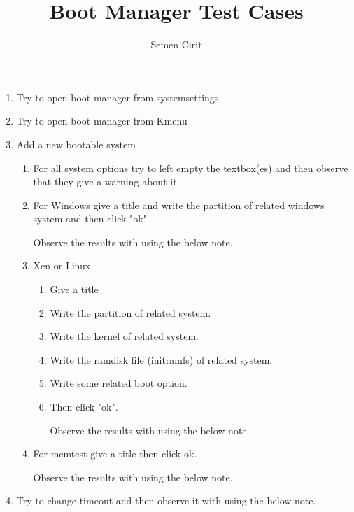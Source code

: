 \documentclass[a4paper,10pt]{article}
\title{Boot Manager Test Cases}
\author{Semen Cirit}
\begin{document}
\maketitle

\begin{enumerate}
    \item Try to open boot-manager from systemsettings.
    \item Try to open boot-manager from Kmenu
    \item Add a new bootable system
    \begin{enumerate}
        \item For all system options try to left empty the textbox(es) and then observe that they give a warning about it.

        \item For Windows give a title and write the partition of related windows system and then click "ok".

            Observe the results with using the below note.


\item Xen or Linux 
\begin{enumerate}
    \item Give a title
    \item Write the partition of related system.
    \item Write the kernel of related system.
    \item Write the ramdisk file (initramfs) of related system.
    \item Write some related boot option.
    \item Then click "ok".

          Observe the results with using the below note.

\end{enumerate}

\item For memtest give a title then click ok.

    Observe the results with using the below note.

    \end{enumerate}
\item Try to change timeout and then observe it with using the below note.
\end{enumerate}
\end{document}
